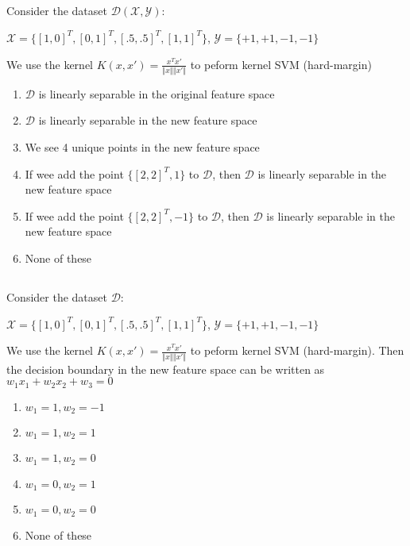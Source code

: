 \begin{frame}
\section{}
Consider the dataset $\mathcal{D(X,Y)}$:

$\mathcal{X} = \{[1,0]^T, [0,1]^T, [.5,.5]^T, [1,1]^T\}$, $\mathcal{Y} = \{+1,+1,-1,-1\}$

We use the kernel $K(x,x') = \frac{x^Tx'}{\Vert x\Vert \Vert x'\Vert}$ to peform kernel SVM (hard-margin)
\begin{enumerate}[label=(\Alph*)]
\item $\mathcal{D}$ is linearly separable in the original feature space
\item $\mathcal{D}$ is linearly separable in the new feature space    %
\item We see 4 unique points in the new feature space
\item If wee add the point  $\{[2,2]^T, 1\}$ to $\mathcal{D}$, then $\mathcal{D}$ is linearly separable in the new feature space
\item If wee add the point  $\{[2,2]^T, -1\}$ to $\mathcal{D}$, then $\mathcal{D}$ is linearly separable in the new feature space   %
\item None of these     %
\end{enumerate}
\end{frame}

\begin{frame}
\section{}
Consider the dataset $\mathcal{D}$:

$\mathcal{X} = \{[1,0]^T, [0,1]^T, [.5,.5]^T, [1,1]^T\}$, $\mathcal{Y} = \{+1,+1,-1,-1\}$

We use the kernel $K(x,x') = \frac{x^Tx'}{\Vert x\Vert \Vert x'\Vert}$ to peform kernel SVM (hard-margin).  Then the decision boundary in the new feature space can be written as
$w_1x_1 + w_2x_2 + w_3=0$
\begin{enumerate}[label=(\Alph*)]
\item $w_1=1,w_2=-1$
\item $w_1=1,w_2=1$   %
\item $w_1=1,w_2=0$
\item $w_1=0,w_2=1$
\item $w_1=0,w_2=0$
\item None of these   %
\end{enumerate}
\end{frame}
